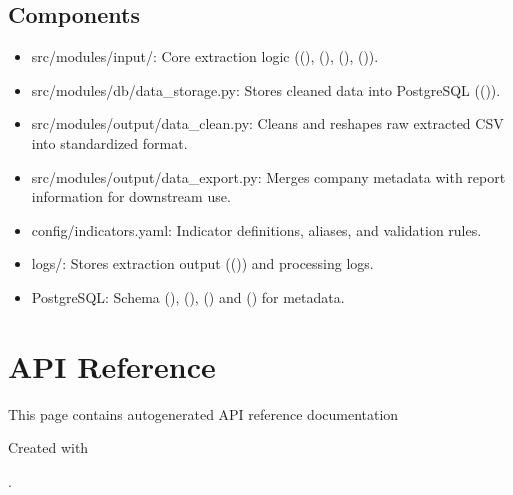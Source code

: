 \documentclass[letterpaper,10pt,english]{sphinxmanual}
\begin{document}
\section{Components}
\label{\detokenize{architecture_overview:components}}\begin{itemize}
\item {} 
\sphinxAtStartPar
src/modules/input/: Core extraction logic ((), (), (), ()).

\item {} 
\sphinxAtStartPar
src/modules/db/data\_storage.py: Stores cleaned data into PostgreSQL (()).

\item {} 
\sphinxAtStartPar
src/modules/output/data\_clean.py: Cleans and reshapes raw extracted CSV into standardized format.

\item {} 
\sphinxAtStartPar
src/modules/output/data\_export.py: Merges company metadata with report information for downstream use.

\item {} 
\sphinxAtStartPar
config/indicators.yaml: Indicator definitions, aliases, and validation rules.

\item {} 
\sphinxAtStartPar
logs/: Stores extraction output (()) and processing logs.

\item {} 
\sphinxAtStartPar
PostgreSQL: Schema (), (), () and () for metadata.

\end{itemize}

\sphinxstepscope


\chapter{API Reference}
\label{\detokenize{autoapi/index:api-reference}}\label{\detokenize{autoapi/index::doc}}
\sphinxAtStartPar
This page contains auto\sphinxhyphen{}generated API reference documentation %
\begin{footnote}[1]\sphinxAtStartFootnote
Created with 
%
\end{footnote}.
\end{document}
